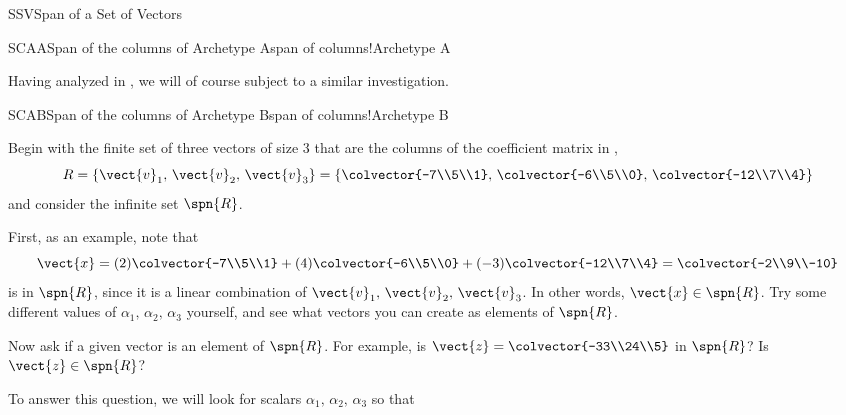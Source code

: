 \begin{subsect}{SSV}{Span of a Set of Vectors}
\begin{example}{SCAA}{Span of the columns of Archetype A}{span of columns!Archetype A}
%
\end{example}
%
\begin{para}Having analyzed  in , we will of course subject  to a similar investigation.\end{para}
%
%
\begin{example}{SCAB}{Span of the columns of Archetype B}{span of columns!Archetype B}
\begin{para}Begin with the finite set of three vectors of size $3$ that are the columns of the coefficient matrix in ,
%
\begin{equation*}
R=\{\vect{v}_1,\,\vect{v}_2,\,\vect{v}_3\}
=\left\{
\colvector{-7\\5\\1},\,\colvector{-6\\5\\0},\,\colvector{-12\\7\\4}
\right\}
\end{equation*}
%
and consider the infinite set $\spn{R}$.\end{para}
%
\begin{para}First, as an example, note that
%
\begin{equation*}
\vect{x}=(2)\colvector{-7\\5\\1}+(4)\colvector{-6\\5\\0}+(-3)\colvector{-12\\7\\4}=
\colvector{-2\\9\\-10}
\end{equation*}
%
is in $\spn{R}$, since it is a linear combination of $\vect{v}_1,\,\vect{v}_2,\,\vect{v}_3$.  In other words, $\vect{x}\in\spn{R}$.  Try some different values of $\alpha_1,\,\alpha_2,\,\alpha_3$ yourself, and see what vectors you can create as elements of $\spn{R}$.\end{para}
%
\begin{para}Now ask if a given vector is an element of $\spn{R}$.  For example, is $\vect{z}=\colvector{-33\\24\\5}$ in $\spn{R}$?   Is $\vect{z}\in\spn{R}$?\end{para}
%
\begin{para}To answer this question, we will look for scalars $\alpha_1,\,\alpha_2,\,\alpha_3$ so that

\end{para}
\end{example}
\end{subsect}
